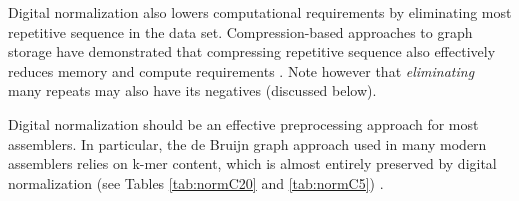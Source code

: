 \documentclass[10pt]{article}
\begin{document}
Digital normalization also lowers computational requirements by
eliminating most repetitive sequence in the data set.
Compression-based approaches to graph storage have demonstrated that
compressing repetitive sequence also effectively reduces memory and
compute requirements \cite{pubmed22139935,pubmed22156294}.  Note
however that {\em eliminating} many repeats may also have its
negatives (discussed below).

Digital normalization should be an effective preprocessing approach
for most assemblers.  In particular, the de Bruijn graph approach used
in many modern assemblers relies on k-mer content, which is almost
entirely preserved by digital normalization (see Tables \ref{tab:normC20}
and \ref{tab:normC5}) \cite{pubmed20211242}.




\end{document}
